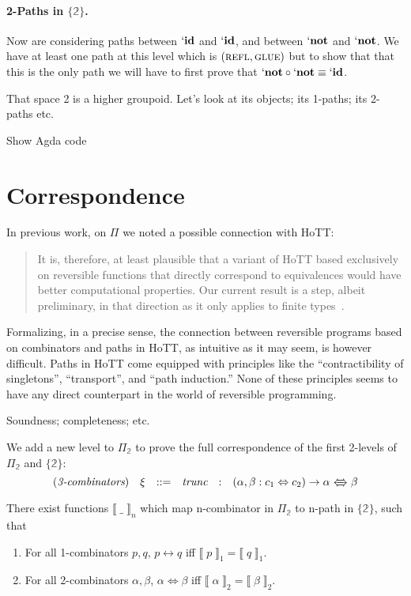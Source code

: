 \documentclass{entcs}
\newcommand{\trunc}{\textit{trunc}}
\newcommand{\reflp}{\textsc{refl}}
\newcommand{\gluep}{\textsc{glue}}
\newcommand{\iso}{\leftrightarrow}
\newcommand{\isotwo}{\Leftrightarrow}
\newcommand{\isothree}{\Lleftarrow \! \! \! \! \Rrightarrow}
\newcommand{\bt}{\mathbb{2}}
\newcommand{\dbracket}[1]{\ensuremath{\llbracket \; #1 \; \rrbracket}}
\newcommand{\PiTwo}{\ensuremath{\Pi_{\mathbb{2}}}}
\begin{document}
\paragraph*{2-Paths in $\{\bt\}$.} Now are considering paths between
$`\mathbf{id}$ and $`\mathbf{id}$, and between $`\mathbf{not}$ and
$`\mathbf{not}$. We have at least one path at this level which is
$(\reflp,\gluep)$ but to show that that this is the only path we will have to
first prove that $`\mathbf{not} \circ `\mathbf{not} \equiv `\mathbf{id}$.

That space {2} is a higher groupoid. Let's look at its objects; its 1-paths; its
2-paths etc.

Show Agda code

\section{Correspondence}
\label{sec:connection}

In previous work, on $\Pi$ we noted a possible connection with HoTT:
\begin{quote}
  It is, therefore, at least plausible that a variant of HoTT based exclusively
  on reversible functions that directly correspond to equivalences would have
  better computational properties. Our current result is a step, albeit
  preliminary, in that direction as it only applies to finite
  types~\cite{Carette2016}.
\end{quote}
Formalizing, in a precise sense, the connection between reversible programs
based on combinators and paths in HoTT, as intuitive as it may seem, is however
difficult. Paths in HoTT come equipped with principles like the
``contractibility of singletons'', ``transport'', and ``path induction.'' None
of these principles seems to have any direct counterpart in the world of
reversible programming.

Soundness; completeness; etc.

We add a new level to $\PiTwo$ to prove the full correspondence of the first 2-levels of $\PiTwo$ and $\{\bt\}$:
\[\def\arraystretch{0.8}\begin{array}{l@{\quad}rclrl}
(\textit{3-combinators}) & \xi &::=& \trunc &:& (\alpha, \beta : c_1 \isotwo c_2) \to \alpha \isothree \beta
\end{array}\]


\begin{theorem}[Soundness and completeness for $\PiTwo$]
  There exist functions $\dbracket{ \_ }_n$ which map n-combinator in $\PiTwo$ to n-path in $\{\bt\}$,
  such that
  \begin{enumerate}
  \item For all 1-combinators $p, q$, $p \iso q$ iff $\dbracket{ p }_1 = \dbracket{ q }_1$.
  \item For all 2-combinators $\alpha, \beta$, $\alpha \isotwo \beta$ iff $\dbracket{ \alpha }_2 = \dbracket{ \beta }_2$.
  \end{enumerate}
\end{theorem}
\end{document}
